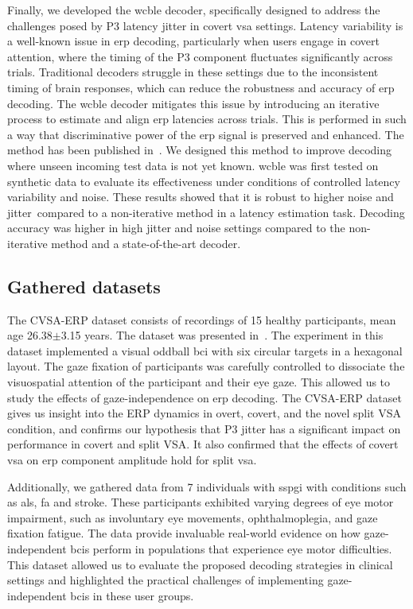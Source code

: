 Finally, we developed the \acf{wcble} decoder, specifically designed to address
the challenges posed by P3 latency jitter in covert \ac{vsa} settings.
Latency variability is a well-known issue in \ac{erp} decoding, particularly
when users engage in covert attention, where the timing of the P3 component
fluctuates significantly across trials.
Traditional decoders struggle in these settings due to the inconsistent timing
of brain responses, which can reduce the robustness and accuracy of
\ac{erp} decoding.
The \ac{wcble} decoder mitigates this issue by introducing an iterative process
to estimate and align \ac{erp} latencies across trials.
This is performed in such a way that discriminative power of the \ac{erp}
signal is preserved and enhanced.
The method has been published in~\textcite{VanDenKerchove2024}.
We designed this method to improve decoding where
unseen incoming test data is not yet known.
\Ac{wcble} was first tested on synthetic data to evaluate its
effectiveness under conditions of controlled latency variability and noise.
These results showed that it is robust to higher noise and jitter\ compared to
a non-iterative method in a latency estimation task.
Decoding accuracy was higher in high jitter and noise
settings compared to the non-iterative method and a state-of-the-art
decoder.

\subsection{Gathered datasets}
The CVSA-ERP dataset consists of recordings of 15 healthy participants, mean age
26.38$\pm$3.15 years.
The dataset was presented in~\textcite{VanDenKerchove2024}.
The experiment in this dataset implemented a visual oddball \ac{bci} with six
circular targets in a hexagonal layout.
The gaze fixation of participants was carefully controlled to dissociate the
visuospatial attention of the participant and their eye gaze.
This allowed us to study the effects of gaze-independence on \ac{erp} decoding.
The CVSA-ERP dataset gives us insight into the ERP dynamics in overt, covert, and the
novel split VSA condition, and confirms our hypothesis that P3 jitter has a
significant impact on performance in covert and split VSA.
It also confirmed that the effects of covert \ac{vsa} on \ac{erp} component
amplitude hold for split \ac{vsa}.

Additionally, we gathered data from 7 individuals with \ac{sspgi} with conditions such as
\ac{als}, \ac{fa} and stroke.
These participants exhibited varying degrees of eye motor impairment, such as
involuntary eye movements, ophthalmoplegia, and gaze fixation fatigue.
The data provide invaluable real-world evidence on how gaze-independent
\acp{bci} perform in populations that experience eye motor difficulties.
This dataset allowed us to evaluate the proposed decoding strategies in clinical settings and
highlighted the practical challenges of implementing gaze-independent \acp{bci} in these user
groups.

